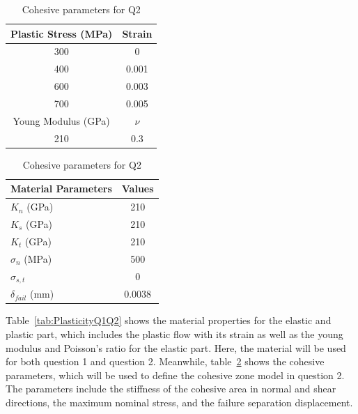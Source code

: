 \documentclass[12pt]{article}
\begin{document}
\begin{table}[H]
\centering
\begin{minipage}{0.49\textwidth}
\centering
\caption{Flow curve data for Q1 and Q2}
\label{tab:PlasticityQ1Q2}
\begin{tabular}{cc}
    \toprule
    Plastic Stress (MPa) & Strain \\
    \midrule
    300 & 0 \\
    400 & 0.001 \\
    600 & 0.003 \\
    700 & 0.005 \\
    \toprule
    Young Modulus (GPa) & $\nu$ \\
    \midrule
    210 & 0.3 \\
    \bottomrule
\end{tabular}
\end{minipage}
\hfill
\begin{minipage}{0.49\textwidth}
\centering
\caption{Cohesive parameters for Q2}
\label{tab:CohesiveQ2}
\begin{tabular}{lc}
    \toprule
    Material Parameters & Values \\
    \midrule
    $K_n$ (GPa) & 210 \\
    $K_s$ (GPa) & 210 \\
    $K_t$ (GPa) & 210 \\
    $\sigma_n$ (MPa) & 500 \\
    $\sigma_{s,t}$ & 0 \\
    $\delta_{fail}$ (mm) & 0.0038 \\
    \bottomrule
\end{tabular}
\end{minipage}
\end{table}


\vspace{1em}
\hspace{2em}Table~\ref{tab:PlasticityQ1Q2} shows the material properties for the elastic and plastic part, which includes the plastic flow with its strain as well
as the young modulus and Poisson's ratio for the elastic part. Here, the material 
will be used for both question 1 and question 2. Meanwhile, table~\ref{tab:CohesiveQ2} shows the cohesive parameters, which will be used to define
the cohesive zone model in question 2. The parameters include the stiffness of the cohesive area in normal and shear 
directions, the maximum nominal stress, and the failure separation displacement.
\end{document}
